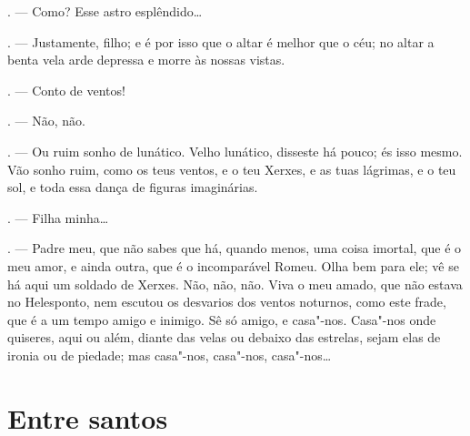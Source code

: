 \begin{linenumbers}
\begin{Parskip}
. --- Como? Esse astro esplêndido\ldots{}

. --- Justamente, filho; e é por isso que o altar é melhor
que o céu; no altar a benta vela arde depressa e morre às nossas vistas.

. --- Conto de ventos!

. --- Não, não.

. --- Ou ruim sonho de lunático. Velho lunático, disseste há
pouco; és isso mesmo. Vão sonho ruim, como os teus ventos, e o teu
Xerxes, e as tuas lágrimas, e o teu sol, e toda essa dança de figuras
imaginárias.

. --- Filha minha\ldots{}

. --- Padre meu, que não sabes que há, quando menos, uma coisa
imortal, que é o meu amor, e ainda outra, que é o incomparável Romeu.
Olha bem para ele; vê se há aqui um soldado de Xerxes. Não, não, não.
Viva o meu amado, que não estava no Helesponto, nem escutou os desvarios
dos ventos noturnos, como este frade, que é a um tempo amigo e inimigo.
Sê só amigo, e casa"-nos. Casa"-nos onde quiseres, aqui ou além, diante
das velas ou debaixo das estrelas, sejam elas de ironia ou de piedade;
mas casa"-nos, casa"-nos, casa"-nos\ldots{}
\end{Parskip}

\end{linenumbers}

\chapter{Entre santos}

